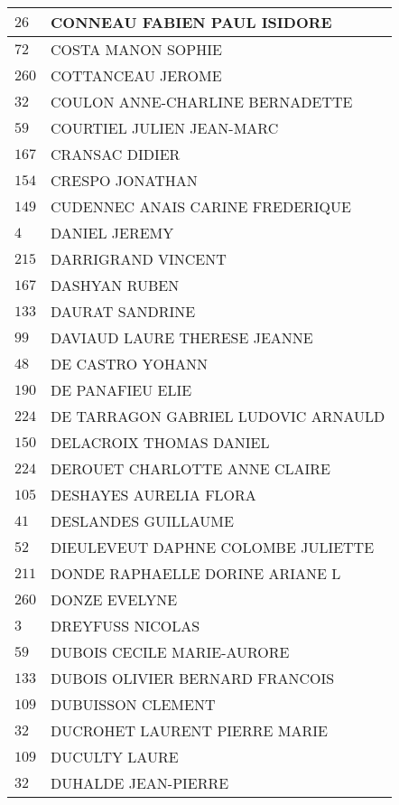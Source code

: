 \begin{xltabular}{\linewidth}{|l|X|}
    \hline
    $26$ & CONNEAU FABIEN PAUL ISIDORE \\
    \hline
    $72$ & COSTA MANON SOPHIE \\
    \hline
    $260$ & COTTANCEAU JEROME \\
    \hline
    $32$ & COULON ANNE-CHARLINE BERNADETTE \\
    \hline
    $59$ & COURTIEL JULIEN JEAN-MARC \\
    \hline
    $167$ & CRANSAC DIDIER \\
    \hline
    $154$ & CRESPO JONATHAN \\
    \hline
    $149$ & CUDENNEC ANAIS CARINE FREDERIQUE \\
    \hline
    $4$ & DANIEL JEREMY \\
    \hline
    $215$ & DARRIGRAND VINCENT \\
    \hline
    $167$ & DASHYAN RUBEN \\
    \hline
    $133$ & DAURAT SANDRINE \\
    \hline
    $99$ & DAVIAUD LAURE THERESE JEANNE \\
    \hline
    $48$ & DE CASTRO YOHANN \\
    \hline
    $190$ & DE PANAFIEU ELIE \\
    \hline
    $224$ & DE TARRAGON GABRIEL LUDOVIC ARNAULD \\
    \hline
    $150$ & DELACROIX THOMAS DANIEL \\
    \hline
    $224$ & DEROUET CHARLOTTE ANNE CLAIRE \\
    \hline
    $105$ & DESHAYES AURELIA FLORA \\
    \hline
    $41$ & DESLANDES GUILLAUME \\
    \hline
    $52$ & DIEULEVEUT DAPHNE COLOMBE JULIETTE \\
    \hline
    $211$ & DONDE RAPHAELLE DORINE ARIANE L \\
    \hline
    $260$ & DONZE EVELYNE \\
    \hline
    $3$ & DREYFUSS NICOLAS \\
    \hline
    $59$ & DUBOIS CECILE MARIE-AURORE \\
    \hline
    $133$ & DUBOIS OLIVIER BERNARD FRANCOIS \\
    \hline
    $109$ & DUBUISSON CLEMENT \\
    \hline
    $32$ & DUCROHET LAURENT PIERRE MARIE \\
    \hline
    $109$ & DUCULTY LAURE \\
    \hline
    $32$ & DUHALDE JEAN-PIERRE \\

\end{xltabular}
